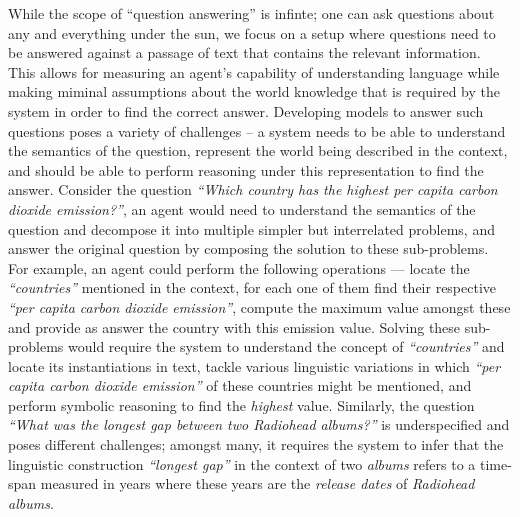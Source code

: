 \documentclass[main.tex]{subfiles}
\begin{document}
While the scope of ``question answering'' is infinte; one can ask questions about any and everything under the sun, we focus on a setup where questions need to be answered against a passage of text that contains the relevant information.  This allows for measuring an agent's capability of understanding language while making miminal assumptions about the world knowledge that is required by the system in order to find the correct answer.
Developing models to answer such questions poses a variety of challenges -- a system needs to be able to understand the semantics of the question, represent the world being described in the context, and should be able to perform reasoning under this representation to find the answer.
Consider the question \textit{``Which country has the highest per capita carbon dioxide emission?''}, an agent would need to understand the semantics of the question and decompose it into multiple simpler but interrelated problems, and answer the original question by composing the solution to these sub-problems.  For example, an agent could perform the following operations --- locate the \textit{``countries''} mentioned in the context, for each one of them find their respective \textit{``per capita carbon dioxide emission''}, compute the maximum value amongst these and provide as answer the country with this emission value.
Solving these sub-problems would require the system to understand the concept of \textit{``countries''} and locate its instantiations in text, tackle various linguistic variations in which \textit{``per capita carbon dioxide emission''} of these countries might be mentioned, and perform symbolic reasoning to find the \textit{highest} value.  Similarly, the question \textit{``What was the longest gap between two Radiohead albums?''} is underspecified and poses different challenges; amongst many, it requires the system to infer that the linguistic construction \textit{``longest gap''} in the context of two \textit{albums} refers to a time-span measured in years where these years are the \textit{release dates} of \textit{Radiohead albums}.
\end{document}

